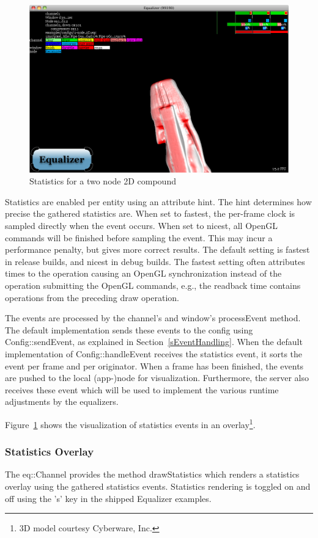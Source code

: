 \documentclass[10pt,a4]{scrartcl}
\newcommand{\fig}[1]{Figure~\ref{#1}}
\newcommand{\sref}[1]{Section~\ref{#1}}
\begin{document}
\begin{figure}
  \includegraphics[width=.618\textwidth]{images/statistics}
  {\caption{\label{fStatistics}Statistics for a two node 2D compound}}
\end{figure}
Statistics are enabled per entity using an attribute hint. The hint determines
how precise the gathered statistics are. When set to \textsf{fastest}, the
per-frame clock is sampled directly when the event occurs. When set to
\textsf{nicest}, all OpenGL commands will be finished before sampling the
event. This may incur a performance penalty, but gives more correct results. The
default setting is fastest in release builds, and nicest in debug builds. The
fastest setting often attributes times to the operation causing an OpenGL
synchronization instead of the operation submitting the OpenGL commands, e.g.,
the readback time contains operations from the preceding draw operation.

The events are processed by the channel's and window's \textsf{processEvent}
method. The default implementation sends these events to the config using
\textsf{Config::sendEvent}, as explained in \sref{sEventHandling}. When the
default implementation of \textsf{Config::handleEvent} receives the statistics
event, it sorts the event per frame and per originator. When a frame has been
finished, the events are pushed to the local (app-)node for
visualization. Furthermore, the server also receives these event which will be
used to implement the various runtime adjustments by the equalizers.

\fig{fStatistics} shows the visualization of statistics events in an
overlay\footnote{3D model courtesy Cyberware, Inc.}.

\subsubsection{\label{sStatisticsOverlay}Statistics Overlay}

The \textsf{eq::Channel} provides the method \textsf{drawStatistics} which
renders a statistics overlay using the gathered statistics events. Statistics
rendering is toggled on and off using the 's' key in the shipped Equalizer
examples.
\end{document}
